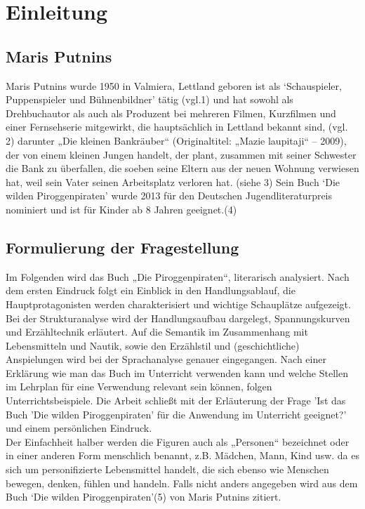 \chapter{Einleitung}

\section{Maris Putnins}
Maris Putnins wurde 1950 in Valmiera, Lettland geboren ist als `Schauspieler, Puppenspieler und Bühnenbildner' 
tätig (vgl.1) und hat sowohl als Drehbuchautor als auch als Produzent bei mehreren Filmen, Kurzfilmen und einer 
Fernsehserie mitgewirkt, die hauptsächlich in Lettland bekannt  sind, (vgl. 2) darunter „Die kleinen Bankräuber“ 
(Originaltitel: „Mazie laupitaji“ – 2009), der von einem kleinen Jungen handelt, der plant, zusammen mit seiner 
Schwester die Bank zu überfallen, die soeben seine Eltern aus der neuen Wohnung verwiesen hat, weil sein Vater 
seinen Arbeitsplatz verloren hat. (siehe 3) 
Sein Buch `Die wilden Piroggenpiraten' wurde 2013 für den Deutschen Jugendliteraturpreis nominiert und ist für Kinder 
ab 8 Jahren geeignet.(4)

\section{Formulierung der Fragestellung}
Im Folgenden wird das Buch „Die Piroggenpiraten“, literarisch analysiert. Nach dem ersten Eindruck folgt ein
Einblick in den Handlungsablauf, die Hauptprotagonisten werden charakterisiert und wichtige Schauplätze aufgezeigt. 
Bei der Strukturanalyse wird der Handlungsaufbau dargelegt, Spannungskurven und Erzähltechnik erläutert. 
Auf die Semantik im Zusammenhang mit Lebensmitteln und Nautik, sowie 
den Erzählstil und (geschichtliche) Anspielungen wird bei der Sprachanalyse genauer eingegangen. Nach einer Erklärung wie man das Buch im Unterricht verwenden kann und welche Stellen im Lehrplan für eine Verwendung relevant sein können, folgen Unterrichtsbeispiele. Die Arbeit schließt mit der Erläuterung der Frage 'Ist das Buch 'Die wilden Piroggenpiraten' für die Anwendung im Unterricht geeignet?' und einem persönlichen Eindruck.
\\
Der Einfachheit halber werden die Figuren auch als „Personen“ bezeichnet oder in einer anderen 
Form menschlich benannt, z.B. Mädchen, Mann, Kind usw. da es sich um personifizierte Lebensmittel handelt, die sich ebenso wie Menschen bewegen, denken, fühlen und handeln. Falls nicht anders angegeben wird aus dem 
Buch `Die wilden Piroggenpiraten'(5) von Maris Putnins zitiert.

